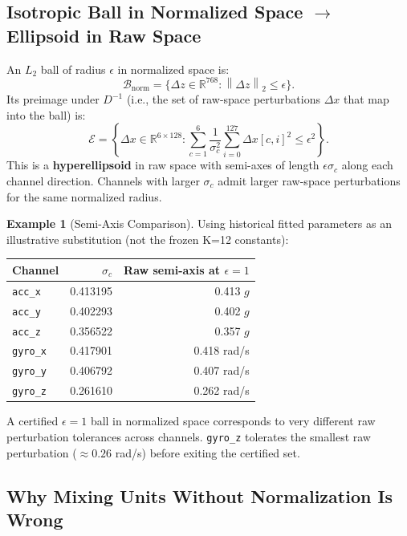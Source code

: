 \documentclass[11pt, a4paper]{article}
\theoremstyle{definition}
\newtheorem{example}{Example}[section]
\theoremstyle{plain}
\newcommand{\R}{\mathbb{R}}
\newcommand{\norm}[2]{\left\|#1\right\|_{#2}}
\newcommand{\code}[1]{{\small\ttfamily\nolinkurl{#1}}}
\begin{document}
\subsection{Isotropic Ball in Normalized Space $\to$ Ellipsoid in Raw Space}

An $L_2$ ball of radius $\epsilon$ in normalized space is:
\[
  \mathcal{B}_{\text{norm}} = \bigl\{ \Delta z \in \R^{768} : \norm{\Delta z}{2} \le \epsilon \bigr\}.
\]
Its preimage under $D^{-1}$ (i.e., the set of raw-space perturbations $\Delta x$
that map into the ball) is:
\[
  \mathcal{E} = \left\{ \Delta x \in \R^{6 \times 128} :
    \sum_{c=1}^6 \frac{1}{\sigma_c^2} \sum_{i=0}^{127} \Delta x[c,i]^2 \le \epsilon^2 \right\}.
\]
This is a \textbf{hyperellipsoid} in raw space with semi-axes of length
$\epsilon \sigma_c$ along each channel direction. Channels with larger $\sigma_c$
admit larger raw-space perturbations for the same normalized radius.

\begin{example}[Semi-Axis Comparison]
  Using historical fitted parameters as an illustrative substitution (not the frozen K=12 constants):
  \begin{center}
  \small
  \begin{tabular}{@{}lrr@{}}
  \toprule
  Channel & $\sigma_c$ & Raw semi-axis at $\epsilon = 1$ \\
  \midrule
  \code{acc_x} & 0.413195 & 0.413 $g$ \\
  \code{acc_y} & 0.402293 & 0.402 $g$ \\
  \code{acc_z} & 0.356522 & 0.357 $g$ \\
  \code{gyro_x} & 0.417901 & 0.418 rad/s \\
  \code{gyro_y} & 0.406792 & 0.407 rad/s \\
  \code{gyro_z} & 0.261610 & 0.262 rad/s \\
  \bottomrule
  \end{tabular}
  \end{center}
  A certified $\epsilon = 1$ ball in normalized space corresponds to very different
  raw perturbation tolerances across channels. \code{gyro_z} tolerates the smallest
  raw perturbation ($\approx 0.26$ rad/s) before exiting the certified set.
\end{example}

\subsection{Why Mixing Units Without Normalization Is Wrong}
\end{document}
